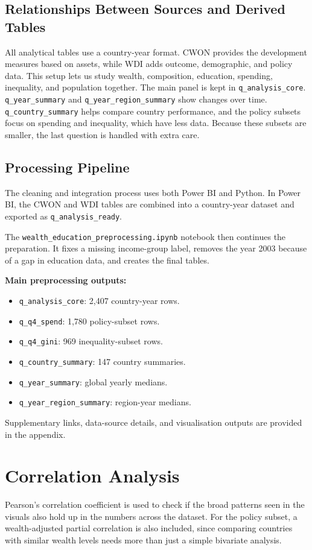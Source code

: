 \documentclass{vgtc}
\begin{document}
\subsection{Relationships Between Sources and Derived Tables}
All analytical tables use a country-year format. CWON provides the development measures based on assets, while WDI adds outcome, demographic, and policy data. This setup lets us study wealth, composition, education, spending, inequality, and population together. The main panel is kept in \texttt{q\_analysis\_core}. \texttt{q\_year\_summary} and \texttt{q\_year\_region\_summary} show changes over time. \texttt{q\_country\_summary} helps compare country performance, and the policy subsets focus on spending and inequality, which have less data. Because these subsets are smaller, the last question is handled with extra care.

\subsection{Processing Pipeline}
The cleaning and integration process uses both Power BI and Python. In Power BI, the CWON and WDI tables are combined into a country-year dataset and exported as \texttt{q\_analysis\_ready}.

The \texttt{wealth\_education\_preprocessing.ipynb} notebook then continues the preparation. It fixes a missing income-group label, removes the year 2003 because of a gap in education data, and creates the final tables.

\textbf{Main preprocessing outputs:}
\begin{itemize}[leftmargin=*, itemsep=0.2em, topsep=0.3em]
  \item \texttt{q\_analysis\_core}: 2{,}407 country-year rows.
  \item \texttt{q\_q4\_spend}: 1{,}780 policy-subset rows.
  \item \texttt{q\_q4\_gini}: 969 inequality-subset rows.
  \item \texttt{q\_country\_summary}: 147 country summaries.
  \item \texttt{q\_year\_summary}: global yearly medians.
  \item \texttt{q\_year\_region\_summary}: region-year medians.
\end{itemize}
Supplementary links, data-source details, and visualisation outputs are provided in the appendix.
\section{Correlation Analysis}
Pearson's correlation coefficient is used to check if the broad patterns seen in the visuals also hold up in the numbers across the dataset. For the policy subset, a wealth-adjusted partial correlation is also included, since comparing countries with similar wealth levels needs more than just a simple bivariate analysis.
\end{document}
